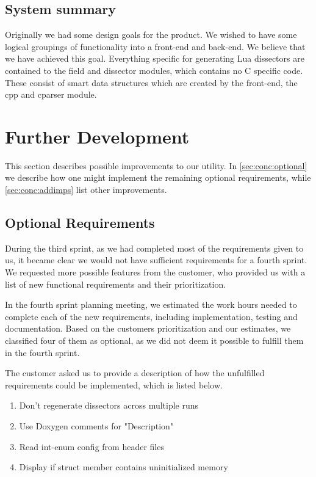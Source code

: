 \subsection{System summary}
Originally we had some design goals for the product. We wished to have some
logical groupings of functionality into a front-end and back-end. We believe
that we have achieved this goal. Everything specific for generating Lua
dissectors are contained to the field and dissector modules, which contains
no C specific code. These consist of smart data structures which are created
by the front-end, the cpp and cparser module.


\section{Further Development}
\label{sec:eval:furtherdev}
This section describes possible improvements to our utility.
In \autoref{sec:conc:optional} we describe how one might implement the remaining
optional requirements, while \autoref{sec:conc:addimps} list other improvements.

\subsection{Optional Requirements}
\label{sec:conc:optional}
During the third sprint, as we had completed most of the requirements given to
us, it became clear we would not have sufficient requirements for a fourth
sprint. We requested more possible features from the customer, who provided us
with a list of new functional requirements and their prioritization.

In the fourth sprint planning meeting, we estimated the work hours needed to
complete each of the new requirements, including implementation, testing and
documentation. Based on the customers prioritization and our estimates, we
classified four of them as optional, as we did not deem it possible to
fulfill them in the fourth sprint.

The customer asked us to provide a description of how the unfulfilled
requirements could be implemented, which is listed below.
\begin{enumerate}
\item Don't regenerate dissectors across multiple runs
\item Use Doxygen comments for "Description"	
\item Read int-enum config from header files
\item Display if struct member contains uninitialized memory
\end{enumerate}

